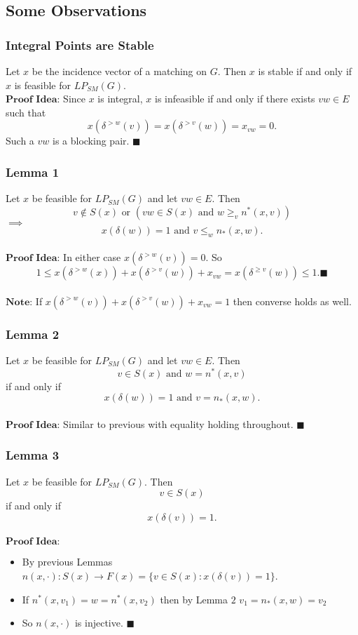 \documentclass{beamer}
\begin{document}
\subsection{Some Observations}
\begin{frame}
\frametitle{Integral Points are Stable}
Let $x$ be the incidence vector of a matching on $G$. Then $x$ is stable if and only if $x$ is feasible for $LP_{SM}(G)$.\\
$\textbf{Proof Idea:}$ Since $x$ is integral, $x$ is infeasible if and only if there exists $vw \in E$ such that $$ x(\delta^{>w}(v)) = x(\delta^{>v}(w)) = x_{vw} = 0. $$
Such a $vw$ is a blocking pair. $\blacksquare$
\end{frame}

\begin{frame}
\frametitle{Lemma 1}
Let $x$ be feasible for $LP_{SM}(G)$ and let $vw \in E$. Then $$ v \not\in S(x) \text{ or } (vw \in S(x) \text{ and } w \geq_v n^*(x,v)) $$ $\implies$ $$ x(\delta(w)) = 1 \text{ and } v \leq_w n_*(x,w). $$\\
$\textbf{Proof Idea:}$ In either case $x(\delta^{>w}(v)) = 0$. So $$1 \leq x(\delta^{>w}(x)) + x(\delta^{>v}(w)) + x_{vw} = x(\delta^{\geq v}(w)) \leq 1. \blacksquare$$\\
$\textbf{Note:}$ If $x(\delta^{>w}(v)) + x(\delta^{>v}(w)) + x_{vw} = 1$ then converse holds as well.
\end{frame}

\begin{frame}
\frametitle{Lemma 2}
Let $x$ be feasible for $LP_{SM}(G)$ and let $vw \in E$. Then $$v \in S(x) \text{ and } w = n^*(x,v)$$ if and only if $$x(\delta(w)) = 1 \text{ and } v = n_*(x,w). $$\\
$\textbf{Proof Idea:}$ Similar to previous with equality holding throughout. $\blacksquare$
\end{frame}

\begin{frame}
\frametitle{Lemma 3}
Let $x$ be feasible for $LP_{SM}(G)$. Then $$ v \in S(x) $$ if and only if $$x(\delta(v)) = 1.$$ \\
$\textbf{Proof Idea:}$
\begin{itemize}
\item By previous Lemmas $n(x,\cdot) : S(x) \rightarrow F(x) = \{v \in S(x) : x(\delta(v)) = 1 \}$.
\item If $n^*(x,v_1) = w = n^*(x,v_2)$ then by Lemma $2$ $v_1 = n_*(x,w) = v_2$
\item So $n(x,\cdot)$ is injective. $\blacksquare$
\end{itemize}
\end{frame}
\end{document}
